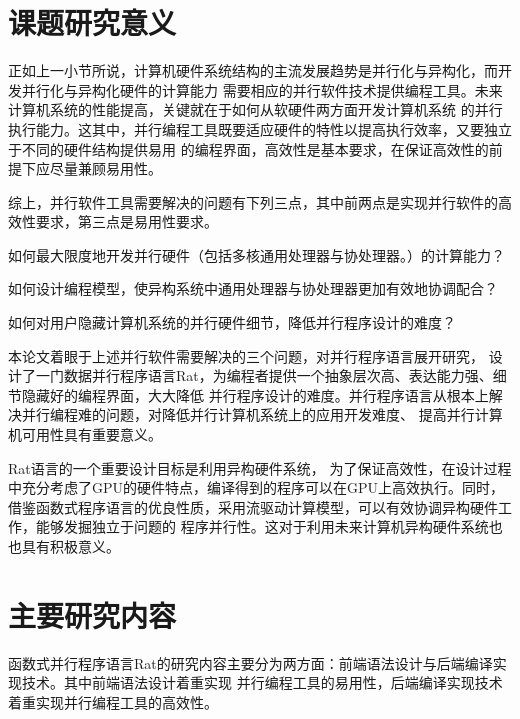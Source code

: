 \section{课题研究意义}
正如上一小节所说，计算机硬件系统结构的主流发展趋势是并行化与异构化，而开发并行化与异构化硬件的计算能力
需要相应的并行软件技术提供编程工具。未来计算机系统的性能提高，关键就在于如何从软硬件两方面开发计算机系统
的并行执行能力。这其中，并行编程工具既要适应硬件的特性以提高执行效率，又要独立于不同的硬件结构提供易用
的编程界面，高效性是基本要求，在保证高效性的前提下应尽量兼顾易用性。

综上，并行软件工具需要解决的问题有下列三点，其中前两点是实现并行软件的高效性要求，第三点是易用性要求。
\begin{compactitem}
  \item 如何最大限度地开发并行硬件（包括多核通用处理器与协处理器。）的计算能力？
  \item 如何设计编程模型，使异构系统中通用处理器与协处理器更加有效地协调配合？
  \item 如何对用户隐藏计算机系统的并行硬件细节，降低并行程序设计的难度？
\end{compactitem}

本论文着眼于上述并行软件需要解决的三个问题，对并行程序语言展开研究，
设计了一门数据并行程序语言Rat，为编程者提供一个抽象层次高、表达能力强、细节隐藏好的编程界面，大大降低
并行程序设计的难度。并行程序语言从根本上解决并行编程难的问题，对降低并行计算机系统上的应用开发难度、
提高并行计算机可用性具有重要意义。

Rat语言的一个重要设计目标是利用异构硬件系统，
为了保证高效性，在设计过程中充分考虑了GPU的硬件特点，编译得到的程序可以在GPU上高效执行。同时，
借鉴函数式程序语言的优良性质，采用流驱动计算模型，可以有效协调异构硬件工作，能够发掘独立于问题的
程序并行性。这对于利用未来计算机异构硬件系统也也具有积极意义。


\section{主要研究内容}
函数式并行程序语言Rat的研究内容主要分为两方面：前端语法设计与后端编译实现技术。其中前端语法设计着重实现
并行编程工具的易用性，后端编译实现技术着重实现并行编程工具的高效性。

